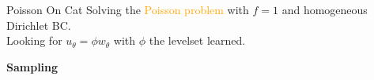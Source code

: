 \begin{frame}{Poisson On Cat}	
	 Solving the \textcolor{orange}{Poisson problem} with $f=1$ and homogeneous Dirichlet BC. \\
	 Looking for $u_\theta = \phi w_\theta$ with $\phi$ the levelset learned. 
	
	\begin{center}
		\begin{minipage}{0.32\linewidth}
			\textbf{Sampling}
			
			\vspace{-10pt}
			\centering
		\end{minipage} \qquad 
		\begin{minipage}{0.32\linewidth}
			\centering
		\end{minipage} 
	\end{center}

	\begin{center}
	\end{center}
\end{frame}